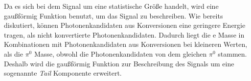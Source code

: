 Da es sich bei dem Signal um eine statistische Größe handelt, wird eine gaußförmig Funktion benutzt, um das Signal zu beschreiben.
\newline
Wie bereits diskutiert, können Photonenkandidaten aus Konversionen eine geringere Energie tragen, als nicht konvertierte Photonenkandidaten.
Dadurch liegt die                                                                                                                                                                                                                                                                                                                                                                                                                                                                                                                                                                                                                                                                                                                                                                                                                                                                                                                                                                                                                                                                                                                                                                                                                                                                                                                                                                                                                                                                                                                                                                                                       e Masse in Kombinationen mit Photonenkandidaten aus Konversionen bei kleineren Werten, als die $\pi^{0}$ Masse, obwohl die Photonenkandidaten von dem gleichen $\pi^{0}$ stammen.
Deshalb wird die gaußförmig Funktion zur Beschreibung des Signals um eine sogenannte \textit{Tail} Komponente erweitert.
